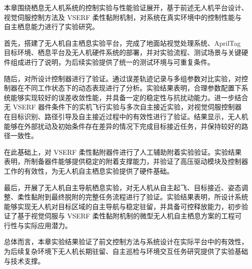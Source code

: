 本章围绕栖息无人机系统的控制实验与性能验证展开，基于前述无人机平台设计、视觉伺服控制方法及 VSERF 柔性黏附机制，对系统在真实环境中的控制性能与自主栖息能力进行了实验研究。

首先，搭建了无人机自主栖息实验平台，完成了地面站视觉处理系统、AprilTag 目标环境、栖息平台及无人机硬件系统的部署，并对实验流程、测试场景与关键硬件组成进行了说明，为后续实验提供了统一的测试环境与可重复条件。

随后，对所设计控制器进行了验证。通过误差轨迹记录与多组参数对比实验，对控制器在不同工作状态下的动态表现进行了分析。实验结果表明，合理参数配置下系统能够实现较好的误差收敛性能，并具备一定的稳定性与抗扰动能力。进一步结合无 VSERF 器件条件下的实机飞行实验与多次自主接近实验，对视觉伺服控制器在目标识别、路径引导及自主接近过程中的有效性进行了验证。结果显示，无人机能够在外部扰动及初始条件存在差异的情况下完成目标接近任务，并保持较好的路径一致性。

在此基础上，对 VSERF 柔性黏附器件进行了人工辅助附着实验验证。实验结果表明，所制备器件能够提供稳定的附着支撑能力，并验证了高压驱动模块及控制器工作的有效性，为无人机自主栖息实验提供了硬件基础。

最后，开展了无人机自主导航栖息实验，对无人机从自主起飞、目标接近、姿态调整、柔性黏附到最终脱附的完整任务流程进行了验证。实验结果表明，所设计系统能够实现无人机对目标区域的自主导航与稳定驻留，并具备可控释放能力，初步验证了基于视觉伺服与 VSERF 柔性黏附机制的微型无人机自主栖息方案的工程可行性与实际应用潜力。

总体而言，本章实验结果验证了前文控制方法与系统设计在实际平台中的有效性，为后续复杂环境下无人机长期驻留、自主巡检与环境交互任务研究提供了实验基础与技术支撑。
